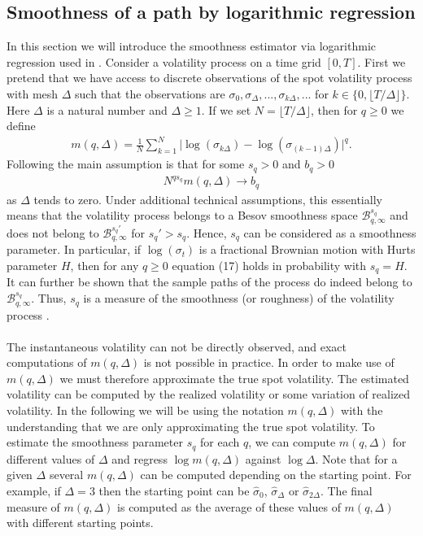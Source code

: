 \documentclass{article}
\begin{document}
\subsection{Smoothness of a path by logarithmic regression} 
In this section we will introduce the smoothness estimator via logarithmic regression used in \cite{gatheral}. Consider a volatility process on a time grid $[0,T]$. First we pretend that we have access to discrete observations of the spot volatility process with mesh $\Delta$ such that the observations are $\sigma_0, \sigma_\Delta, ..., \sigma_{k\Delta},...$ for $k \in \{0, \lfloor T / \Delta \rfloor\}$. Here $\Delta$ is a natural number and $\Delta\geq 1$. If we set $N=\lfloor T / \Delta \rfloor$, then for $q\geq 0$ we define
\begin{align*}
m(q,\Delta) = \frac{1}{N} \sum_{k=1}^N \lvert \log(\sigma_{k\Delta})-\log(\sigma_{(k-1)\Delta})\rvert^q.
\end{align*}
Following \cite{gatheral} the main assumption is that for some $s_q>0$ and $b_q>0$
\begin{align}
N^{qs_q}m(q,\Delta)\to b_q
\end{align}
as $\Delta$ tends to zero. Under additional technical assumptions, this essentially means that the volatility process belongs to a Besov smoothness space $\mathcal{B}^{s_q}_{q,\infty}$ and does not belong to $\mathcal{B}^{s_q'}_{q,\infty}$ for $s_q'>s_q$. Hence, $s_q$ can be considered as a smoothness parameter. In particular, if $\log(\sigma_t)$ is a fractional Brownian motion with Hurts parameter $H$, then for any $q\geq 0$  equation (17) holds in probability with $s_q=H$. It can further be shown that the sample paths of the process do indeed belong to $\mathcal{B}^{s_q}_{q,\infty}$. Thus, $s_q$ is a measure of the smoothness (or roughness) of the volatility process \cite{gatheral}.\\\\
The instantaneous volatility can not be directly observed, and exact computations of $m(q,\Delta)$ is not possible in practice.  In order to make use of $m(q,\Delta)$ we must therefore approximate the true spot volatility. The estimated volatility can be computed by the realized volatility or some variation of realized volatility. In the following we will be using the notation $m(q, \Delta)$ with the understanding that we are only approximating the true spot volatility. To estimate the smoothness parameter $s_q$ for each $q$, we can compute $m(q,\Delta)$ for different values of $\Delta$ and regress $\log m(q,\Delta)$ against $\log \Delta$. Note that for a given $\Delta$ several $m(q,\Delta)$ can be computed depending on the starting point. For example, if $\Delta=3$ then the starting point can be $\hat{\sigma}_0$, $\hat{\sigma}_{\Delta}$ or $\hat{\sigma}_{2\Delta}$. The final measure of $m(q,\Delta)$ is computed as the average of these values of $m(q,\Delta)$ with different starting points.\\\\
\end{document}

